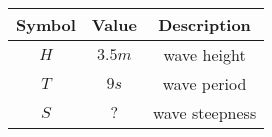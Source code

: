 \begin{tabular}{|c|c|c|}
	\hline
	\textbf{Symbol} & \textbf{Value} &
	\textbf{Description}\\[6pt]
	\hline
	$H$ &  $3.5m$ & wave height\\[6pt]
	\hline 
	$T$ & $9s$ & wave period\\[6pt]
	\hline
	$S$ & $ ? $ & wave steepness\\[6pt]
	\hline
\end{tabular}
